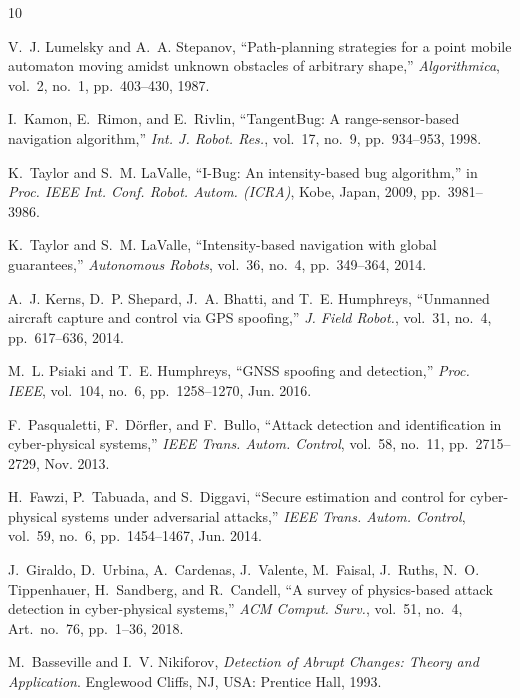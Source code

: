 \documentclass[12pt, a4paper]{article}
\begin{document}

\begin{thebibliography}{10}

V.~J. Lumelsky and A.~A. Stepanov, ``Path-planning strategies for a point mobile automaton moving amidst unknown obstacles of arbitrary shape,'' \textit{Algorithmica}, vol.~2, no.~1, pp.~403--430, 1987.

I.~Kamon, E.~Rimon, and E.~Rivlin, ``TangentBug: A range-sensor-based navigation algorithm,'' \textit{Int. J. Robot. Res.}, vol.~17, no.~9, pp.~934--953, 1998.

K.~Taylor and S.~M. LaValle, ``I-Bug: An intensity-based bug algorithm,'' in \textit{Proc. IEEE Int. Conf. Robot. Autom. (ICRA)}, Kobe, Japan, 2009, pp.~3981--3986.

K.~Taylor and S.~M. LaValle, ``Intensity-based navigation with global guarantees,'' \textit{Autonomous Robots}, vol.~36, no.~4, pp.~349--364, 2014.

A.~J. Kerns, D.~P. Shepard, J.~A. Bhatti, and T.~E. Humphreys, ``Unmanned aircraft capture and control via GPS spoofing,'' \textit{J. Field Robot.}, vol.~31, no.~4, pp.~617--636, 2014.

M.~L. Psiaki and T.~E. Humphreys, ``GNSS spoofing and detection,'' \textit{Proc. IEEE}, vol.~104, no.~6, pp.~1258--1270, Jun. 2016.

F.~Pasqualetti, F.~D{\"o}rfler, and F.~Bullo, ``Attack detection and identification in cyber-physical systems,'' \textit{IEEE Trans. Autom. Control}, vol.~58, no.~11, pp.~2715--2729, Nov. 2013.

H.~Fawzi, P.~Tabuada, and S.~Diggavi, ``Secure estimation and control for cyber-physical systems under adversarial attacks,'' \textit{IEEE Trans. Autom. Control}, vol.~59, no.~6, pp.~1454--1467, Jun. 2014.

J.~Giraldo, D.~Urbina, A.~Cardenas, J.~Valente, M.~Faisal, J.~Ruths, N.~O. Tippenhauer, H.~Sandberg, and R.~Candell, ``A survey of physics-based attack detection in cyber-physical systems,'' \textit{ACM Comput. Surv.}, vol.~51, no.~4, Art.~no.~76, pp.~1--36, 2018.

M.~Basseville and I.~V. Nikiforov, \textit{Detection of Abrupt Changes: Theory and Application}. Englewood Cliffs, NJ, USA: Prentice Hall, 1993.

\end{thebibliography}
\end{document}
